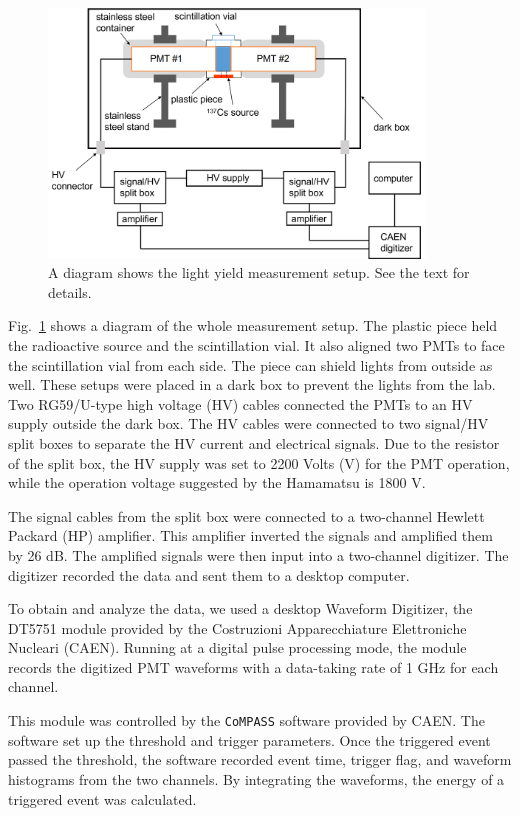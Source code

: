 \begin{figure}[htbp]
	\centering	
	\includegraphics[width=10cm]{teLSsetup.png}
	\caption[A diagram shows the light yield measurement setup.]{A diagram shows the light yield measurement setup. See the text for details.}
	\label{teLSsetup}
\end{figure}

Fig.~\ref{teLSsetup} shows a diagram of the whole measurement setup. The plastic piece held the radioactive source and the scintillation vial. It also aligned two PMTs to face the scintillation vial from each side. The piece can shield lights from outside as well. These setups were placed in a dark box to prevent the lights from the lab. Two RG59/U-type high voltage (HV) cables connected the PMTs to an HV supply outside the dark box. The HV cables were connected to two signal/HV split boxes to separate the HV current and electrical signals. Due to the resistor of the split box, the HV supply was set to 2200 Volts (V) for the PMT operation, while the operation voltage suggested by the Hamamatsu is 1800 V. 

The signal cables from the split box were connected to a two-channel Hewlett Packard (HP) amplifier. This amplifier inverted the signals and amplified them by 26 dB. The amplified signals were then input into a two-channel digitizer. The digitizer recorded the data and sent them to a desktop computer.

To obtain and analyze the data, we used a desktop Waveform Digitizer, the DT5751 module provided by the Costruzioni Apparecchiature Elettroniche Nucleari (CAEN). Running at a digital pulse processing mode, the module records the digitized PMT waveforms with a data-taking rate of 1 GHz for each channel\cite{caen}.

This module was controlled by the \texttt{CoMPASS} software provided by CAEN. The software set up the threshold and trigger parameters. Once the triggered event passed the threshold, the software recorded event time, trigger flag, and waveform histograms from the two channels. By integrating the waveforms, the energy of a triggered event was calculated\cite{compass}.

